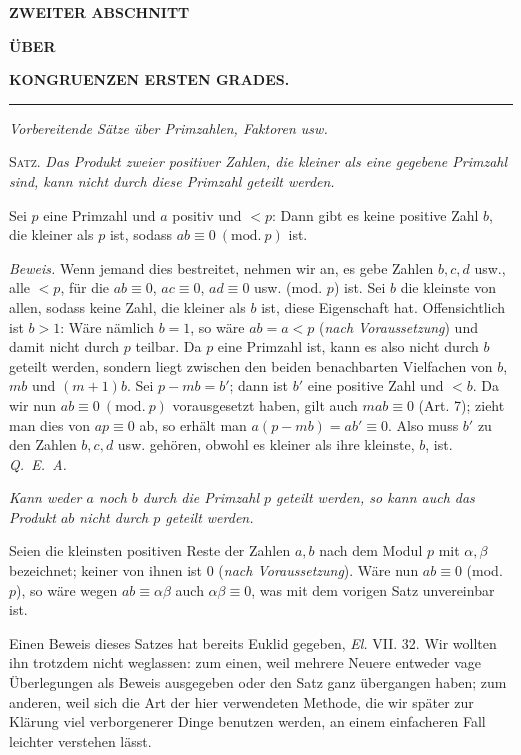 \begin{center}
{\large\bfseries ZWEITER ABSCHNITT}\par\bigskip
{\small\bfseries ÜBER}\par\bigskip
{\large\bfseries KONGRUENZEN ERSTEN GRADES.}
\end{center}
\begin{center}\rule{0.09\linewidth}{0.3pt}\end{center}
\begin{center}\emph{Vorbereitende Sätze über Primzahlen, Faktoren usw.}\end{center}
\textsc{Satz}. \emph{Das Produkt zweier positiver Zahlen, die kleiner als eine gegebene Primzahl sind, kann nicht durch diese Primzahl geteilt werden.}

Sei $p$ eine Primzahl und $a$ positiv und $<p$: Dann gibt es keine positive Zahl $b$, die kleiner als $p$ ist, sodass $ab\equiv 0\ (\mathrm{mod.}\ p)$ ist.

\emph{Beweis.} Wenn jemand dies bestreitet, nehmen wir an, es gebe Zahlen $b, c, d$ usw., alle $<p$, für die $ab\equiv 0$, $ac\equiv 0$, $ad\equiv 0$ usw. (mod. $p$) ist. Sei $b$ die kleinste von allen, sodass keine Zahl, die kleiner als $b$ ist, diese Eigenschaft hat. Offensichtlich ist $b>1$: Wäre nämlich $b=1$, so wäre $ab=a<p$ (\emph{nach Voraussetzung}) und damit nicht durch $p$ teilbar. Da $p$ eine Primzahl ist, kann es also nicht durch $b$ geteilt werden, sondern liegt zwischen den beiden benachbarten Vielfachen von $b$, $mb$ und $(m+1)b$. Sei $p-mb=b'$; dann ist $b'$ eine positive Zahl und $<b$. Da wir nun $ab\equiv 0\ (\mathrm{mod.}\ p)$ vorausgesetzt haben, gilt auch $mab\equiv 0$ (Art. 7); zieht man dies von $ap\equiv 0$ ab, so erhält man $a(p-mb)=ab'\equiv 0$. Also muss $b'$ zu den Zahlen $b, c, d$ usw. gehören, obwohl es kleiner als ihre kleinste, $b$, ist. \emph{Q.~E.~A.}

\emph{Kann weder $a$ noch $b$ durch die Primzahl $p$ geteilt werden, so kann auch das Produkt $ab$ nicht durch $p$ geteilt werden.}

Seien die kleinsten positiven Reste der Zahlen $a, b$ nach dem Modul $p$ mit $\alpha, \beta$ bezeichnet; keiner von ihnen ist $0$ (\emph{nach Voraussetzung}). Wäre nun $ab\equiv 0$ (mod. $p$), so wäre wegen $ab\equiv\alpha\beta$ auch $\alpha\beta\equiv 0$, was mit dem vorigen Satz unvereinbar ist.

Einen Beweis dieses Satzes hat bereits Euklid gegeben, \emph{El.} VII. 32. Wir wollten ihn trotzdem nicht weglassen: zum einen, weil mehrere Neuere entweder vage Überlegungen als Beweis ausgegeben oder den Satz ganz übergangen haben; zum anderen, weil sich die Art der hier verwendeten Methode, die wir später zur Klärung viel verborgenerer Dinge benutzen werden, an einem einfacheren Fall leichter verstehen lässt.

